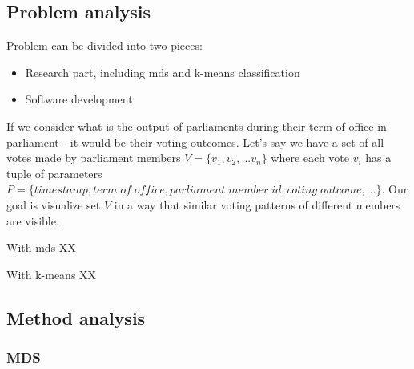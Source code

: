 \documentclass[a4paper,12pt]{article}
\begin{document}
	\hfill

	
	\clearpage
	 
 	 
 	\subsection{Problem analysis}
 	
 	Problem can be divided into two pieces:
 	\begin{itemize}
 		\item Research part, including \gls{mds} and \gls{k-means} classification
 		\item Software development
 	\end{itemize}
 	
 	If we consider what is the output of parliaments during their term of office in parliament - it would be their voting outcomes. Let's say we have a set of all votes made by parliament members $V = \{v_1, v_2, ... v_n\}$ where each vote $v_i$ has a tuple of parameters $P = \{timestamp, term\; of\; office, parliament\;member\;id, voting\;outcome,...\}$. Our goal is visualize set $V$ in a way that similar voting patterns of different members are visible. 
 	
 	With \gls{mds} XX
 	
 	With \gls{k-means} XX
 
 	
 	
 	
 	\subsection{Method analysis}
	\subsubsection{MDS}
\end{document}
